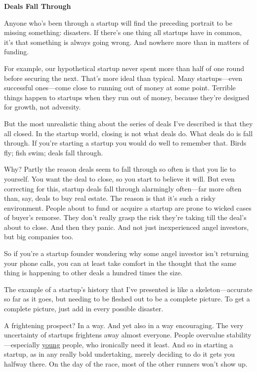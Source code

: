 \textbf{Deals Fall Through}

Anyone who's been through a startup will find the preceding portrait
to be missing something: disasters.  If there's one thing all
startups have in common, it's that something is always going wrong.
And nowhere more than in matters of funding.

For example, our hypothetical startup never spent more than half
of one round before securing the next.  That's more ideal than
typical.  Many startups---even successful ones---come close to
running out of money at some point.  Terrible things happen to
startups when they run out of money, because they're designed for
growth, not adversity.

But the most unrealistic thing about the series of deals I've
described is that they all closed.  In the startup world, closing
is not what deals do.  What deals do is fall through.  If you're
starting a startup you would do well to remember that.  Birds fly;
fish swim; deals fall through.

Why?  Partly the reason deals seem to fall through so often is that
you lie to yourself.  You want the deal to close, so you start to
believe it will.  But even correcting for this, startup deals fall
through alarmingly often---far more often than, say, deals to buy
real estate.  The reason is that it's such a risky environment.
People about to fund or acquire a startup are prone to wicked cases
of buyer's remorse.  They don't really grasp the risk they're taking
till the deal's about to close.  And then they panic.  And not just
inexperienced angel investors, but big companies too.

So if you're a startup founder wondering why some angel investor
isn't returning your phone calls, you can at least take comfort in
the thought that the same thing is happening to other deals a hundred
times the size.

The example of a startup's history that I've presented is like a
skeleton---accurate so far as it goes, but needing to be fleshed
out to be a complete picture.  To get a complete picture, just add
in every possible disaster.

A frightening prospect?  In a way.  And yet also in a way encouraging.
The very uncertainty of startups frightens away almost everyone.
People overvalue stability---especially \href{http://www.paulgraham.com/hiring.html}{young}
people, who ironically need it least.  And so in starting a startup,
as in any really bold undertaking, merely deciding to do it gets
you halfway there.  On the day of the race, most of the other runners
won't show up.







